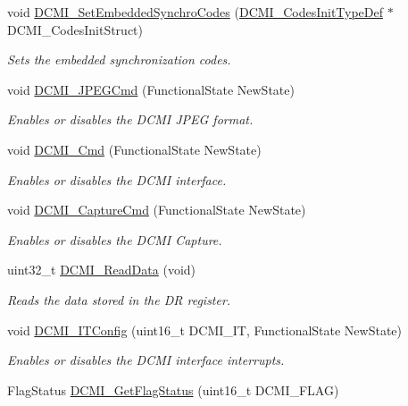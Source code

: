 \begin{DoxyCompactItemize}
void \hyperlink{group___d_c_m_i_ga8888b27bd5aca62d250642468ea6cd6d}{D\-C\-M\-I\-\_\-\-Set\-Embedded\-Synchro\-Codes} (\hyperlink{struct_d_c_m_i___codes_init_type_def}{D\-C\-M\-I\-\_\-\-Codes\-Init\-Type\-Def} $\ast$D\-C\-M\-I\-\_\-\-Codes\-Init\-Struct)
\begin{DoxyCompactList}\small\item\em Sets the embedded synchronization codes. \end{DoxyCompactList}\item 
void \hyperlink{group___d_c_m_i_ga30a38a4858273c05e8f1b4677d744c13}{D\-C\-M\-I\-\_\-\-J\-P\-E\-G\-Cmd} (Functional\-State New\-State)
\begin{DoxyCompactList}\small\item\em Enables or disables the D\-C\-M\-I J\-P\-E\-G format. \end{DoxyCompactList}\item 
void \hyperlink{group___d_c_m_i_ga36bba54c40637b8071aea8ffea71fb84}{D\-C\-M\-I\-\_\-\-Cmd} (Functional\-State New\-State)
\begin{DoxyCompactList}\small\item\em Enables or disables the D\-C\-M\-I interface. \end{DoxyCompactList}\item 
void \hyperlink{group___d_c_m_i_gad00fb33497ffa337a5b2b77fc6aa8d74}{D\-C\-M\-I\-\_\-\-Capture\-Cmd} (Functional\-State New\-State)
\begin{DoxyCompactList}\small\item\em Enables or disables the D\-C\-M\-I Capture. \end{DoxyCompactList}\item 
uint32\-\_\-t \hyperlink{group___d_c_m_i_ga475305bd8694e4cebefcb263c0a5b979}{D\-C\-M\-I\-\_\-\-Read\-Data} (void)
\begin{DoxyCompactList}\small\item\em Reads the data stored in the D\-R register. \end{DoxyCompactList}\item 
void \hyperlink{group___d_c_m_i_ga3d89fb10384dff1dfd9197fbb6c6b2eb}{D\-C\-M\-I\-\_\-\-I\-T\-Config} (uint16\-\_\-t D\-C\-M\-I\-\_\-\-I\-T, Functional\-State New\-State)
\begin{DoxyCompactList}\small\item\em Enables or disables the D\-C\-M\-I interface interrupts. \end{DoxyCompactList}\item 
Flag\-Status \hyperlink{group___d_c_m_i_ga1b66e1966fbea902a8e7015c56db7587}{D\-C\-M\-I\-\_\-\-Get\-Flag\-Status} (uint16\-\_\-t D\-C\-M\-I\-\_\-\-F\-L\-A\-G)

\end{DoxyCompactItemize}
